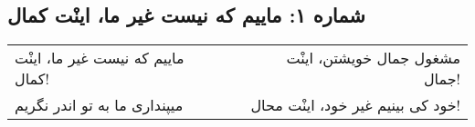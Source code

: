 \begin{center}
\section*{شماره ۱: ماییم که نیست غیر ما، اینْت کمال}
\label{sec:001}
\begin{longtable}{l p{0.5cm} r}
ماییم که نیست غیر ما، اینْت کمال!
&&
مشغول جمال خویشتن، اینْت جمال!
\\
میپنداری ما به تو اندر نگریم
&&
خود کی بینیم غیر خود، اینْت محال!
\\
\end{longtable}
\end{center}
